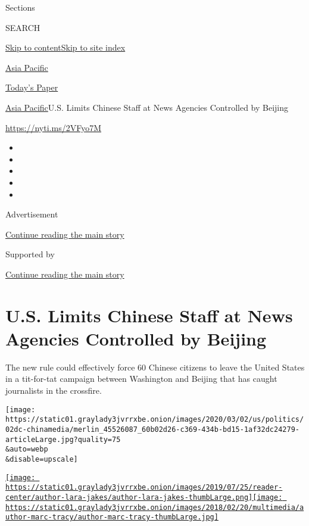 Sections

SEARCH

\protect\hyperlink{site-content}{Skip to
content}\protect\hyperlink{site-index}{Skip to site index}

\href{https://www.nytimes3xbfgragh.onion/section/world/asia}{Asia
Pacific}

\href{https://myaccount.nytimes3xbfgragh.onion/auth/login?response_type=cookie\&client_id=vi}{}

\href{https://www.nytimes3xbfgragh.onion/section/todayspaper}{Today's
Paper}

\href{/section/world/asia}{Asia Pacific}\textbar{}U.S. Limits Chinese
Staff at News Agencies Controlled by Beijing

\href{https://nyti.ms/2VFyo7M}{https://nyti.ms/2VFyo7M}

\begin{itemize}
\item
\item
\item
\item
\item
\end{itemize}

Advertisement

\protect\hyperlink{after-top}{Continue reading the main story}

Supported by

\protect\hyperlink{after-sponsor}{Continue reading the main story}

\hypertarget{us-limits-chinese-staff-at-news-agencies-controlled-by-beijing}{%
\section{U.S. Limits Chinese Staff at News Agencies Controlled by
Beijing}\label{us-limits-chinese-staff-at-news-agencies-controlled-by-beijing}}

The new rule could effectively force 60 Chinese citizens to leave the
United States in a tit-for-tat campaign between Washington and Beijing
that has caught journalists in the crossfire.

\texttt{[image: https://static01.graylady3jvrrxbe.onion/images/2020/03/02/us/politics/02dc-chinamedia/merlin\_45526087\_60b02d26-c369-434b-bd15-1af32dc24279-articleLarge.jpg?quality=75\\\&auto=webp\\\&disable=upscale]}

\href{https://www.nytimes3xbfgragh.onion/by/lara-jakes}{\texttt{[image: https://static01.graylady3jvrrxbe.onion/images/2019/07/25/reader-center/author-lara-jakes/author-lara-jakes-thumbLarge.png]}}\href{https://www.nytimes3xbfgragh.onion/by/marc-tracy}{\texttt{[image: https://static01.graylady3jvrrxbe.onion/images/2018/02/20/multimedia/author-marc-tracy/author-marc-tracy-thumbLarge.jpg]}}

